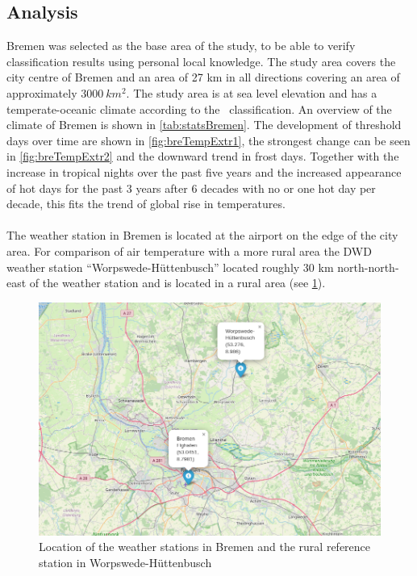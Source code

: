 \documentclass[12pt,a4paper, english,twoside]{scrartcl}
\begin{document}
    \subsection{Analysis}\label{sec:tempanalysis}
      Bremen was selected as the base area of the study, to be able to verify classification results using personal local knowledge. 
      The study area covers the city centre of Bremen and an area of 27 km in all directions covering an area of approximately $3000\ km^2$. 
      The study area is at sea level elevation and has a temperate-oceanic climate according to the~\cite{koppen1930handbuch} classification.
      An overview of the climate of Bremen is shown in \cref{tab:statsBremen}.
            The development of threshold days over time are shown in \cref{fig:breTempExtr1}, the strongest change can be seen in \cref{fig:breTempExtr2} and the downward trend in frost days. 
      Together with the increase in tropical nights over the past five years and the increased appearance of hot days for the past 3 years after 6 decades with no or one hot day per decade, this fits the trend of global rise in temperatures.\\ \\ 
      The weather station in Bremen is located at the airport on the edge of the city area. 
      For comparison of air temperature with a more rural area the \gls{DWD} weather station ``Worpswede-Hüttenbusch'' located roughly 30 km north-north-east of the weather station and is located in a rural area (see \cref{fig:mapWeatherstationsBremen}).
  \begin{figure}[!htbp]
         \centering
            \includegraphics[width=\textwidth]{img/MapWetterstationenBremen.jpeg}
             \caption{Location of the weather stations in Bremen and the rural reference station in Worpswede-Hüttenbusch}\label{fig:mapWeatherstationsBremen}
      \end{figure}
\end{document}
